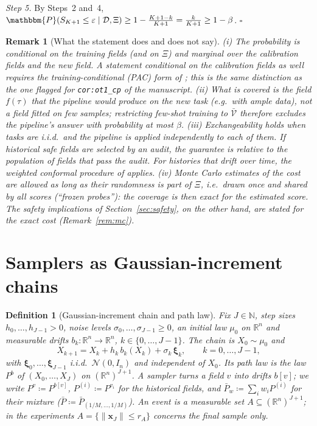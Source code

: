 \documentclass{article}
\newcommand{\RR}{\mathbb{R}}
\newcommand{\NN}{\mathbb{N}}
\newcommand{\cV}{\mathcal{V}}                       %
\newcommand{\cD}{\mathcal{D}}                       %
\newcommand{\Pv}[1]{P^{#1}}                         %
\newcommand{\Pbar}{\bar{P}}                         %
\newcommand{\bx}{\mathbf{x}}
\newcommand{\bxi}{\boldsymbol{\xi}}
\theoremstyle{plain}
\newtheorem{definition}{Definition}
\newtheorem{remark}{Remark}
\begin{document}
\emph{Step 5.} By Steps~2 and~4,
$\mathbbm{P}(S_{K+1}\leq\varepsilon\mid\cD,\Xi)\geq1-\frac{K+1-k}{K+1}=\frac{k}{K+1}\geq1-\beta$.
\hfill $\square$

\begin{remark}[What the statement does and does not say]\label{rem:coverage}
(i) The probability is conditional on the training fields (and on $\Xi$) and marginal over
the calibration fields and the new field. A statement conditional on the calibration fields
as well requires the training-conditional (PAC) form of \citet{vovk2013conditional}; this is
the same distinction as the one flagged for \texttt{cor:ot1\_cp} of the manuscript.
(ii) What is covered is the field $f(\tau)$ that the pipeline would produce on the new task
(e.g.\ with ample data), not a field fitted on few samples; restricting few-shot training to
$\bar{\cV}$ therefore excludes the pipeline's answer with probability at most $\beta$.
(iii) Exchangeability holds when tasks are i.i.d.\ and the pipeline is applied independently
to each of them. If historical safe fields are selected by an audit, the guarantee is relative
to the population of fields that pass the audit. For histories that drift over time, the
weighted conformal procedure of \citet{barber2023conformal} applies.
(iv) Monte Carlo estimates of the cost are allowed as long as their randomness is part of
$\Xi$, i.e.\ drawn once and shared by all scores (``frozen probes''): the coverage is then
exact for the estimated score. The safety implications of Section~\ref{sec:safety}, on the
other hand, are stated for the exact cost (Remark~\ref{rem:mc}).
\end{remark}

\section{Samplers as Gaussian-increment chains}\label{sec:chains}

\begin{definition}[Gaussian-increment chain and path law]\label{def:chain}
Fix $J\in\NN$, step sizes $h_0,\dots,h_{J-1}>0$, noise levels $\sigma_0,\dots,\sigma_{J-1}\geq0$, an
initial law $\mu_0$ on $\RR^n$ and measurable drifts $b_k:\RR^n\to\RR^n$,
$k\in\{0,\dots,J-1\}$. The chain is $X_0\sim\mu_0$ and
\[
  X_{k+1}=X_k+h_k\,b_k(X_k)+\sigma_k\,\bxi_k,\qquad k=0,\dots,J-1,
\]
with $\bxi_0,\dots,\bxi_{J-1}$ i.i.d.\ $\mathcal{N}(0,I_n)$ and independent of $X_0$. Its path law is the
law $P^b$ of $(X_0,\dots,X_J)$ on $(\RR^n)^{J+1}$. A sampler turns a field $v$ into drifts
$b[v]$; we write $\Pv{v}\coloneqq P^{b[v]}$, $P^{(i)}\coloneqq\Pv{v_i}$ for the historical fields,
and $\Pbar_w\coloneqq\sum_iw_iP^{(i)}$ for their mixture ($\Pbar\coloneqq\Pbar_{(1/M,\dots,1/M)}$).
An \emph{event} is a measurable set $A\subseteq(\RR^n)^{J+1}$; in the experiments
$A=\{\|\bx_J\|\leq r_A\}$ concerns the final sample only.
\end{definition}
\end{document}
